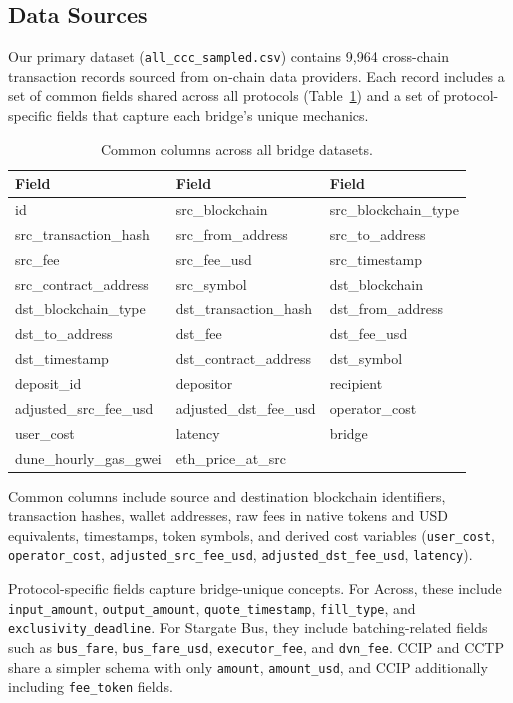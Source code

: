 \subsection{Data Sources}
Our primary dataset (\texttt{all\_ccc\_sampled.csv}) contains 9{,}964 cross-chain transaction records sourced from on-chain data providers. Each record includes a set of common fields shared across all protocols (Table~\ref{tab:common_cols}) and a set of protocol-specific fields that capture each bridge's unique mechanics.

\begin{table}[t]
\centering
\small
\caption{Common columns across all bridge datasets.}
\label{tab:common_cols}
\begin{tabular}{lll}
\toprule
Field & Field & Field \\
\midrule
id & src\_blockchain & src\_blockchain\_type \\
src\_transaction\_hash & src\_from\_address & src\_to\_address \\
src\_fee & src\_fee\_usd & src\_timestamp \\
src\_contract\_address & src\_symbol & dst\_blockchain \\
dst\_blockchain\_type & dst\_transaction\_hash & dst\_from\_address \\
dst\_to\_address & dst\_fee & dst\_fee\_usd \\
dst\_timestamp & dst\_contract\_address & dst\_symbol \\
deposit\_id & depositor & recipient \\
adjusted\_src\_fee\_usd & adjusted\_dst\_fee\_usd & operator\_cost \\
user\_cost & latency & bridge \\
dune\_hourly\_gas\_gwei & eth\_price\_at\_src & \\
\bottomrule
\end{tabular}
\end{table}

Common columns include source and destination blockchain identifiers, transaction hashes, wallet addresses, raw fees in native tokens and USD equivalents, timestamps, token symbols, and derived cost variables (\texttt{user\_cost}, \texttt{operator\_cost}, \texttt{adjusted\_src\_fee\_usd}, \texttt{adjusted\_dst\_fee\_usd}, \texttt{latency}).

Protocol-specific fields capture bridge-unique concepts. For Across, these include \texttt{input\_amount}, \texttt{output\_amount}, \texttt{quote\_timestamp}, \texttt{fill\_type}, and \texttt{exclusivity\_deadline}. For Stargate Bus, they include batching-related fields such as \texttt{bus\_fare}, \texttt{bus\_fare\_usd}, \texttt{executor\_fee}, and \texttt{dvn\_fee}. CCIP and CCTP share a simpler schema with only \texttt{amount}, \texttt{amount\_usd}, and CCIP additionally including \texttt{fee\_token} fields.

